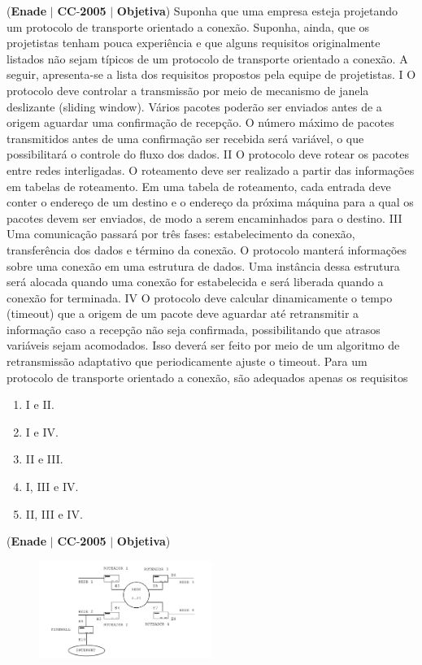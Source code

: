 \documentclass{exam}
\begin{document}
\begin{questions}
\question (\textbf{Enade} $|$ \textbf{CC}-\textbf{2005} $|$ \textbf{Objetiva})
Suponha que uma empresa esteja projetando um protocolo de
transporte orientado a conexão. Suponha, ainda, que os projetistas
tenham pouca experiência e que alguns requisitos originalmente
listados não sejam típicos de um protocolo de transporte
orientado a conexão. A seguir, apresenta-se a lista dos
requisitos propostos pela equipe de projetistas.
I O protocolo deve controlar a transmissão por meio de
mecanismo de janela deslizante (sliding window). Vários
pacotes poderão ser enviados antes de a origem aguardar uma
confirmação de recepção. O número máximo de pacotes
transmitidos antes de uma confirmação ser recebida será
variável, o que possibilitará o controle do fluxo dos dados.
II O protocolo deve rotear os pacotes entre redes interligadas.
O roteamento deve ser realizado a partir das informações em
tabelas de roteamento. Em uma tabela de roteamento, cada
entrada deve conter o endereço de um destino e o endereço da
próxima máquina para a qual os pacotes devem ser enviados,
de modo a serem encaminhados para o destino.
III Uma comunicação passará por três fases: estabelecimento da
conexão, transferência dos dados e término da conexão. O
protocolo manterá informações sobre uma conexão em uma
estrutura de dados. Uma instância dessa estrutura será alocada
quando uma conexão for estabelecida e será liberada quando
a conexão for terminada.
IV O protocolo deve calcular dinamicamente o tempo (timeout)
que a origem de um pacote deve aguardar até retransmitir a
informação caso a recepção não seja confirmada,
possibilitando que atrasos variáveis sejam acomodados. Isso
deverá ser feito por meio de um algoritmo de retransmissão
adaptativo que periodicamente ajuste o timeout.
Para um protocolo de transporte orientado a conexão, são
adequados apenas os requisitos
	\begin{enumerate}[label=\alph*)]
		\item  I e II.
		\item  I e IV.
		\item  II e III.
		\item  I, III e IV.
		\item  II, III e IV.
	\end{enumerate}

\question (\textbf{Enade} $|$ \textbf{CC}-\textbf{2005} $|$ \textbf{Objetiva})


\begin{figure}[H]
	\begin{center}
		\includegraphics[width=0.5\textwidth]{CIENCIA_DA_COMPUTACAO_Prova2005-utf8_figuras/fig-0034.jpg}
	\end{center}
\end{figure}


\end{questions}
\end{document}
